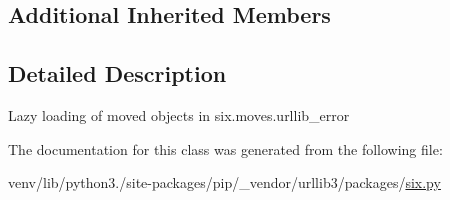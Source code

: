\subsection*{Additional Inherited Members}


\subsection{Detailed Description}
\begin{DoxyVerb}Lazy loading of moved objects in six.moves.urllib_error\end{DoxyVerb}
 

The documentation for this class was generated from the following file\+:\begin{DoxyCompactItemize}
\item 
venv/lib/python3./site-\/packages/pip/\+\_\+vendor/urllib3/packages/\hyperlink{pip_2__vendor_2urllib3_2packages_2six_8py}{six.\+py}\end{DoxyCompactItemize}
